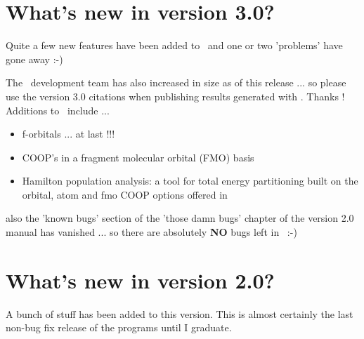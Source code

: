 \chapter{What's new in version 3.0?}

Quite a few new features have been added to \prog\ and one or two
'problems' have gone away :-) 

\noindent The \prog\ development team has also increased in size as of
this release ... so please
use the version 3.0 citations when publishing
results generated with \prog. Thanks ! \\[0.1in]


\noindent Additions to \calcprog\ include ...

\begin{itemize}

\item f-orbitals ... at last !!!

\item COOP's in a fragment molecular orbital (FMO) basis

\item Hamilton population analysis: a tool for total energy partitioning
built on the orbital, atom and fmo COOP options offered in \prog \cite{cohp1,cohp2,cohp3}

\end{itemize}

\noindent also the 'known bugs' section of the 'those damn bugs' chapter of the version 2.0 manual has vanished ... so there are absolutely {\bf NO} bugs left in \prog\ :-) \\[0.1in]




\chapter{What's new in version 2.0?}

A bunch of stuff has been added to this version.  This is almost
certainly the last non-bug fix release of the programs until I
graduate.

